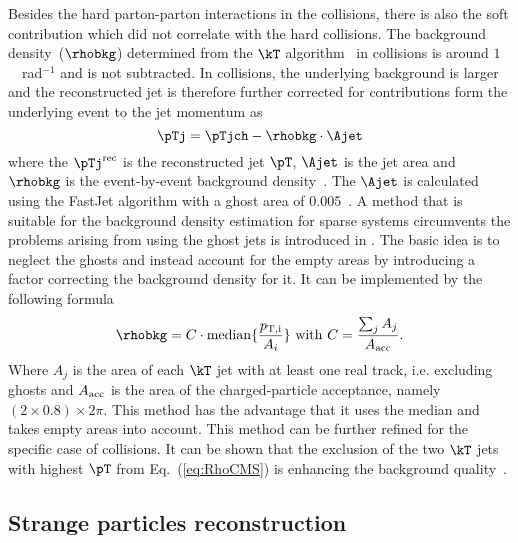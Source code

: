 \documentclass[ALICE,manyauthors]{cernphprep}
\begin{document}
Besides the hard parton-parton interactions in the collisions, there is also the soft contribution which did not correlate with the hard collisions.
The background density~($\rhobkg$) determined from the $\kT$ algorithm~\cite{Catani:1993hr, Ellis:1993tq} in \pp collisions is around $1$~\GeVc~rad$^{-1}$ and is not subtracted.
In \pPb collisions, the underlying background is larger and the reconstructed jet is therefore further corrected for contributions form the underlying event to the jet momentum as
\begin{equation}
\pTj = \pTjch - \rhobkg\cdot\Ajet
\label{eq:DeltaPt}
\end{equation}
where the $\pTj^{\rm rec}$ is the reconstructed jet $\pT$, $\Ajet$ is the jet area and $\rhobkg$ is the event-by-event background density~\cite{Cacciari:2007fd}.
The $\Ajet$ is calculated using the FastJet algorithm with a ghost area of $0.005$~\cite{Cacciari:2008gn}.
A method that is suitable for the background density estimation for sparse systems circumvents the problems arising from using the ghost jets is introduced in \cite{Chatrchyan:2012tt}.
The basic idea is to neglect the ghosts and instead account for the empty areas by introducing a factor correcting the background density for it.
It can be implemented by the following formula
\begin{equation}
\rhobkg = C\cdot{\rm median}\{\frac{p_{\rm T,i}}{A_{i}}\} ~ {\rm with}~ C = \frac{\sum_{j}A_{j}}{A_{\rm acc}}.
\label{eq:RhoCMS}
\end{equation}
Where $A_{j}$ is the area of each $\kT$ jet with at least one real track, i.e. excluding ghosts and $A_{\rm acc}$ is the area of the charged-particle acceptance, namely $(2 \times 0.8) \times 2\pi$.
This method has the advantage that it uses the median and takes empty areas into account.
This method can be further refined for the specific case of \pPb collisions.
It can be shown that the exclusion of the two $\kT$ jets with highest $\pT$ from Eq.~(\ref{eq:RhoCMS}) is enhancing the background quality~\cite{ALICE:2015umm, ALICE:2016faw}.

\subsection{Strange particles reconstruction}%
\label{sec:ParRec}
\end{document}
